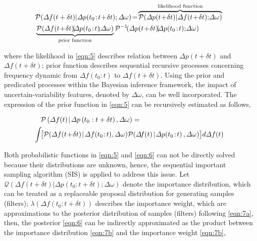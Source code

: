 \documentclass[lettersize,journal]{IEEEtran}
\begin{document}
\vspace{-0.25in}
\begin{newsubequations}
	\begin{align}
		 & \mathcal{P}(\varDelta f(t+ \delta t)|\varDelta p(t_0\!:\! t \!+\! \delta t); \varDelta \omega)\!=\!\overbrace{\mathcal{P}(\varDelta p(t\!+\!\delta t) | \varDelta f(t\!+\!\delta t); \!\varDelta\omega)}^{\textrm{{likelihood function}}} \notag          \\
		 & \underbrace{\mathcal{P}(\varDelta f(t\!+\! \delta t) \!|\! \varDelta p(t_0\!:\! t)\!;\! \varDelta \omega)}_{\textrm{{prior function}}} { {\mathcal{P}^{-1}\!(\varDelta p(t\!+\!\delta t) \!|\! \varDelta p(t_0\!:\! t);\!\varDelta \omega)}}\label{eqn:5}
	\end{align}
\end{newsubequations}
\vspace{-0.125in}

\noindent where the {likelihood} in \eqref{eqn:5} describes relation between \(\varDelta p(t+\delta t)\) and \(\varDelta f(t+\delta t)\); prior function describes sequential recursive processes concerning frequency dynamic from \(\varDelta f(t_0\!:\! t)\) to \(\varDelta f(t \!+\! \delta t)\). Using the prior and predicated processes within the Bayesian inference framework, the impact of uncertain-variability features, denoted by \(\varDelta \omega\), can be well incorporated. The expression of the {prior function} in \eqref{eqn:5} can be recursively estimated as follows,

\vspace{-0.125in}
\begin{newsubequations}
	\begin{align}
		 & \quad \mathcal{P}\left(\varDelta f(t) \!\mid\!  \varDelta p\left(t_{0}: t+\delta t \right), \varDelta \omega\right) = \label{eqn:6}                                                                                                                     \\
		 & \int\! \bigl[ \mathcal{P}(\varDelta f(t\!+\! \delta t) \!\mid\! \varDelta f(t_0\!:\! t), \varDelta \omega) \mathcal{P}\!\left(\varDelta \!f(t) \!\mid\!  \varDelta p\!\left(t_{0}\!: \! t\right), \varDelta \omega\right) \bigr] d\varDelta f(t) \notag
	\end{align}
\end{newsubequations}

Both probabilistic functions in \eqref{eqn:5} and \eqref{eqn:6} can not be directly solved because their distributions are unknown, hence, the sequential important sampling algorithm (SIS) is applied to address this issue.  Let \(\mathcal{Q} (\varDelta f(t+\delta t) | \varDelta p(t_0\!:\!t+\delta t);\varDelta \omega)\) denote the importance distribution, which can be treated as a replaceable proposal distribution for
generating samples (filters); \(\lambda (\varDelta f(t_0\!:\!t\!+\!\delta t))\) describes the importance weight, which are approximations to the posterior distribution of samples (filters) following \eqref{eqn:7a}, then, the posterior \eqref{eqn:6} can be indirectly approximated as the product between the importance distribution \eqref{eqn:7b} and the importance weight \eqref{eqn:7b},
\vspace{-0.125in}
\end{document}
